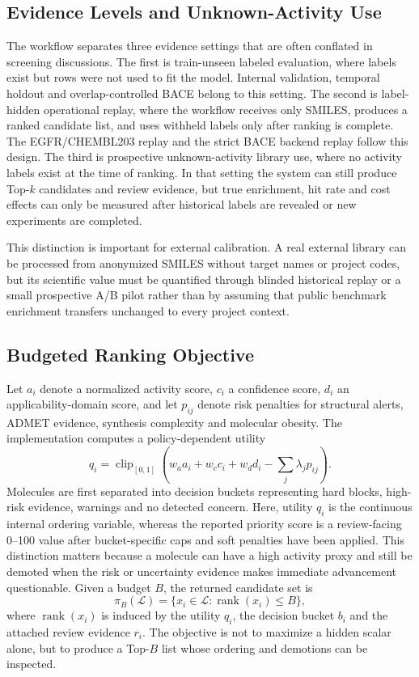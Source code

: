 \documentclass[manuscript=article]{achemso}
\begin{document}
\subsection{Evidence Levels and Unknown-Activity Use}
The workflow separates three evidence settings that are often conflated in
screening discussions. The first is train-unseen labeled evaluation, where
labels exist but rows were not used to fit the model. Internal validation,
temporal holdout and overlap-controlled BACE belong to this setting. The
second is label-hidden operational replay, where the workflow receives only
SMILES, produces a ranked candidate list, and uses withheld labels only after
ranking is complete. The EGFR/CHEMBL203 replay and the strict BACE backend
replay follow this design. The third is prospective unknown-activity library
use, where no activity labels exist at the time of ranking. In that setting
the system can still produce Top-$k$ candidates and review evidence, but true
enrichment, hit rate and cost effects can only be measured after historical
labels are revealed or new experiments are completed.

This distinction is important for external calibration. A real external
library can be processed from anonymized SMILES without target names or project
codes, but its scientific value must be quantified through blinded historical
replay or a small prospective A/B pilot rather than by assuming that public
benchmark enrichment transfers unchanged to every project context.

\subsection{Budgeted Ranking Objective}
Let $a_i$ denote a normalized activity score, $c_i$ a confidence score, $d_i$
an applicability-domain score, and let $p_{ij}$ denote risk penalties for
structural alerts, ADMET evidence, synthesis complexity and molecular obesity.
The implementation computes a policy-dependent utility
\begin{equation}
q_i =
\operatorname{clip}_{[0,1]}\left(
w_a a_i + w_c c_i + w_d d_i - \sum_j \lambda_j p_{ij}
\right).
\end{equation}
Molecules are first separated into decision buckets representing hard blocks,
high-risk evidence, warnings and no detected concern. Here, utility $q_i$ is
the continuous internal ordering variable, whereas the reported priority score
is a review-facing 0--100 value after bucket-specific caps and soft penalties
have been applied. This distinction matters because a molecule can have a high
activity proxy and still be demoted when the risk or uncertainty evidence makes
immediate advancement questionable. Given a budget $B$, the returned candidate
set is
\begin{equation}
\pi_B(\mathcal{L}) =
\{x_i \in \mathcal{L}: \operatorname{rank}(x_i) \leq B\},
\end{equation}
where $\operatorname{rank}(x_i)$ is induced by the utility $q_i$, the decision
bucket $b_i$ and the attached review evidence $r_i$. The objective is not to
maximize a hidden scalar alone, but to produce a Top-$B$ list whose ordering
and demotions can be inspected.
\end{document}
